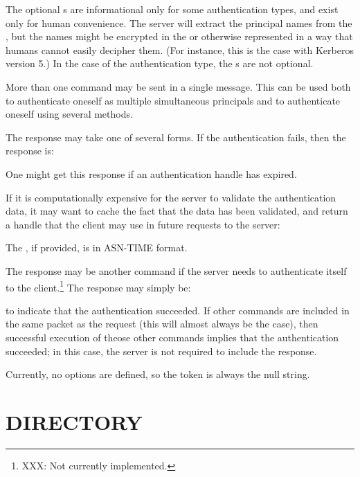 The optional s are informational only for some
authentication types, and exist only for human convenience.  The
server will extract the principal names from the
, but the names might be encrypted in the
 or otherwise represented in a way that
humans cannot easily decipher them.  (For instance, this is the case
with Kerberos version 5.)  In the case of the 
authentication type, the s are not optional.

More than one  command may be sent in a single
message.  This can be used both to authenticate oneself as multiple
simultaneous principals and to authenticate oneself using several methods.

The response may take one of several forms.  If the authentication
fails, then the response is:
\begin{command}
  \zoos{}\zooe
\end{command}
One might get this response if an authentication handle has expired.

If it is computationally expensive for the server to validate the
authentication data, it may want to cache the fact that the data has
been validated, and return a handle that the client may use in future
requests to the server:
\begin{command}
 \zoos{} 
 \zoos{}\zooe \zooe
\end{command}
The , if provided, is in ASN-TIME format.

The response may be another  command if the server
needs to authenticate itself to the client.\footnote{XXX: Not
currently implemented.}  The response may simply be:
\begin{command}
\end{command}
to indicate that the authentication succeeded.  If other commands are
included in the same packet as the  request (this
will almost always be the case), then successful execution of theose
other commands implies that the authentication succeeded; in this case,
the server is not required to include the  response.

Currently, no options are defined, so the  token is
always the null string.

\section{DIRECTORY}

